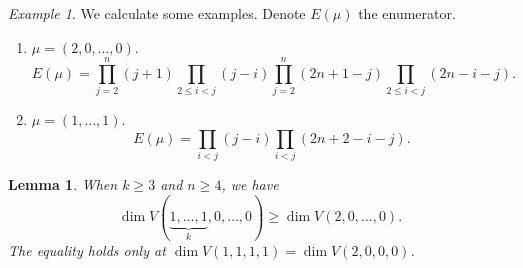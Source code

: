 \documentclass[a4paper]{amsart}
\theoremstyle{plain}
\newtheorem{lem}[thm]{Lemma}
\theoremstyle{remark} \newtheorem{remark}[thm]{Remark}
\theoremstyle{remark} \newtheorem{exercise}{Exercise}
\theoremstyle{remark} \newtheorem{example}{Example}
\numberwithin{equation}{section}
\begin{document}
\begin{example}
	We calculate some examples. Denote $E(\mu)$ the enumerator.
	\begin{enumerate}
		\item $\mu=(2,0,\ldots,0)$.
		\[E(\mu)=\prod_{j=2}^n(j+1)\prod_{2\leqslant i<j}(j-i)\prod_{j=2}^n(2n+1-j)\prod_{2\leqslant i<j}(2n-i-j).\]
		\item $\mu=(1,\ldots,1)$.
		\[E(\mu)=\prod_{i<j}(j-i)\prod_{i<j}(2n+2-i-j).\]
	\end{enumerate}
\end{example}
\fi


\begin{lem}\label{first type}
	When $k\geqslant 3$ and $n\geqslant 4$, we have
	\[\dim V(\underbrace{1,\ldots,1}_k,0,\ldots,0)\geqslant\dim V(2,0,\ldots,0).\]
        The equality holds only at $\dim V(1,1,1,1)=\dim V(2,0,0,0)$.
\end{lem}
\end{document}
